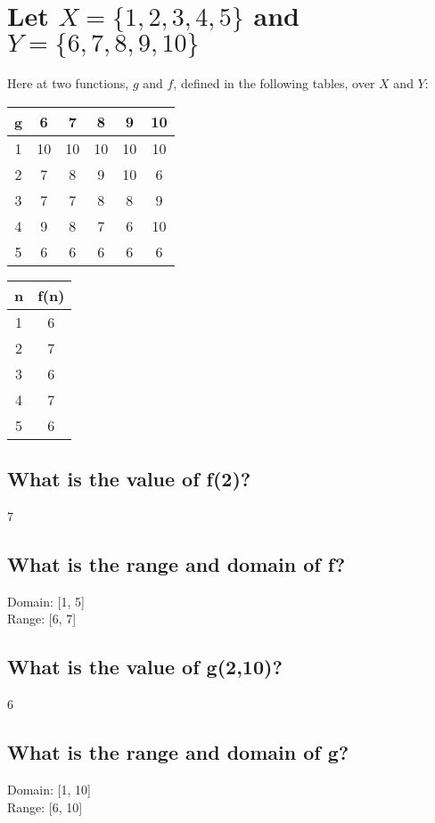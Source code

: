 \documentclass{article}
\begin{document}
\section{Let $X = \{1,2,3,4,5\}$ and $Y = \{6,7,8,9,10\}$}
Here at two functions, $g$ and $f$, defined in the following tables, over $X$ and $Y$:
\begin{center}
	\begin{tabular}{ |c|c|c|c|c|c| } 
		\hline
		g & 6  & 7  & 8  & 9  & 10 \\
		\hline
		1 & 10 & 10 & 10 & 10 & 10 \\
		2 & 7  & 8  & 9  & 10 & 6  \\
		3 & 7  & 7  & 8  & 8  & 9  \\
		4 & 9  & 8  & 7  & 6  & 10 \\
		5 & 6  & 6  & 6  & 6  & 6  \\
		\hline
	\end{tabular}
	        
	\begin{tabular}{ |c|c| }
		\hline
		n & f(n) \\
		\hline
		1 & 6    \\
		2 & 7    \\
		3 & 6    \\
		4 & 7    \\
		5 & 6    \\
		\hline
	\end{tabular}
\end{center}
\subsection{What is the value of f(2)?}
\begin{center}
	7
\end{center}
\subsection{What is the range and domain of f?}
\begin{center}
	Domain: [1, 5] \\
	Range: [6, 7]
\end{center}
\subsection{What is the value of g(2,10)?}
\begin{center}
	6
\end{center}
\subsection{What is the range and domain of g?}
\begin{center}
	Domain: [1, 10] \\
	Range: [6, 10]
\end{center}
\end{document}
